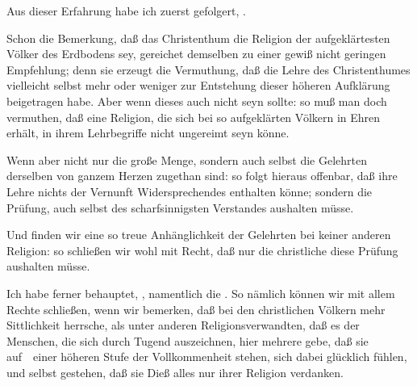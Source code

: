 \begin{aufza}
\item Aus dieser Erfahrung habe ich zuerst gefolgert, .
\begin{aufzb}
\item Schon die Bemerkung, daß das Christenthum die Religion der aufgeklärtesten Völker des Erdbodens sey, gereichet demselben zu einer gewiß nicht geringen Empfehlung; denn sie erzeugt die Vermuthung, daß die Lehre des Christenthumes vielleicht selbst mehr oder weniger zur Entstehung dieser höheren Aufklärung beigetragen habe. Aber wenn dieses auch nicht seyn sollte: so muß man doch vermuthen, daß eine Religion, die sich bei so aufgeklärten Völkern in Ehren erhält, in ihrem Lehrbegriffe nicht ungereimt seyn könne.
\item Wenn aber nicht nur die große Menge, sondern auch selbst die Gelehrten derselben von ganzem Herzen zugethan sind: so folgt hieraus offenbar, daß ihre Lehre nichts der Vernunft Widersprechendes enthalten könne; sondern die Prüfung, auch selbst des scharfsinnigsten Verstandes aushalten müsse.
\item Und finden wir eine so treue Anhänglichkeit der Gelehrten bei keiner anderen Religion: so schließen wir wohl mit Recht, daß nur die christliche diese Prüfung aushalten müsse.
\end{aufzb}
\item Ich habe ferner behauptet, , namentlich die . So nämlich können wir mit allem Rechte schließen, wenn wir bemerken, daß bei den christlichen Völkern mehr Sittlichkeit herrsche, als unter anderen Religionsverwandten, daß es der Menschen, die sich durch Tugend auszeichnen, hier mehrere gebe, daß sie auf~\ einer höheren Stufe der Vollkommenheit stehen, sich dabei glücklich fühlen, und selbst gestehen, daß sie Dieß alles nur ihrer Religion verdanken.
\end{aufza}


\begin{center}\end{center}

